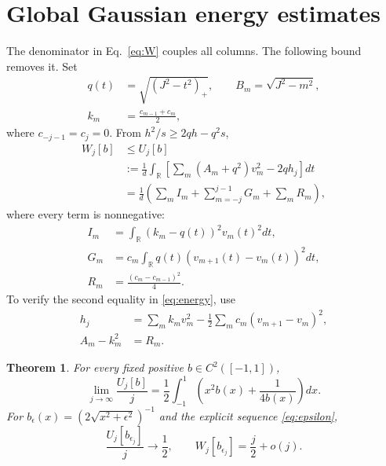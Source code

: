 \documentclass[aps,pra,reprint,superscriptaddress]{revtex4-2}
\newtheorem{theorem}{Theorem}
\theoremstyle{remark}
\newcommand{\R}{\mathbb R}
\begin{document}
\section{Global Gaussian energy estimates}\label{sec:energy-proof}
The denominator in Eq.~\eqref{eq:W} couples all columns. The following bound removes it.
Set
\begin{equation}
\begin{aligned}
q(t)&=\sqrt{(J^2-t^2)_+},\qquad B_m=\sqrt{J^2-m^2},\\
k_m&=\frac{c_{m-1}+c_m}{2},
\end{aligned}
\label{eq:q}
\end{equation}
where $c_{-j-1}=c_j=0$. From $h^2/s\geq2qh-q^2s$,
\begin{equation}
\begin{aligned}
W_j[b]&\leq U_j[b]\\
&:=\frac1d\int_\R
\left[\sum_m(A_m+q^2)v_m^2-2qh_j\right]dt\\
&=\frac1d\left(\sum_m I_m+\sum_{m=-j}^{j-1}G_m+\sum_m R_m\right),
\end{aligned}
\label{eq:energy}
\end{equation}
where every term is nonnegative:
\begin{equation}
\begin{aligned}
I_m&=\int_\R(k_m-q(t))^2v_m(t)^2dt,\\
G_m&=c_m\int_\R q(t)(v_{m+1}(t)-v_m(t))^2dt,\\
R_m&=\frac{(c_m-c_{m-1})^2}{4}.
\end{aligned}
\label{eq:energies}
\end{equation}
To verify the second equality in \eqref{eq:energy}, use
\begin{align*}
 h_j&=\sum_m k_mv_m^2-\frac12\sum_m c_m(v_{m+1}-v_m)^2,\\
 A_m-k_m^2&=R_m.
\end{align*}

\begin{theorem}\label{thm:energy}
For every fixed positive $b\in C^2([-1,1])$,
\begin{equation}
 \lim_{j\to\infty}\frac{U_j[b]}j
 =\frac12\int_{-1}^1
 \left(x^2b(x)+\frac1{4b(x)}\right)dx.
 \label{eq:functional}
\end{equation}
For $b_\epsilon(x)=(2\sqrt{x^2+\epsilon^2})^{-1}$ and the explicit
sequence \eqref{eq:epsilon},
\begin{equation}
 \frac{U_j[b_{\epsilon_j}]}j\longrightarrow\frac12,
 \qquad W_j[b_{\epsilon_j}]=\frac j2+o(j).
 \label{eq:explicit-energy}
\end{equation}
\end{theorem}
\end{document}
